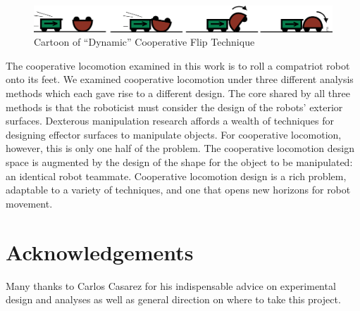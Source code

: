 \documentclass[letterpaper]{report}
\begin{document}
\begin{figure}[ht]
\centering
\includegraphics[width=1.0\textwidth]{Dynamic_CoopCartoon.png}
\caption{Cartoon of ``Dynamic'' Cooperative Flip Technique}
\end{figure}

The cooperative locomotion examined in this work is to roll a compatriot robot onto its feet.
We examined cooperative locomotion under three different analysis methods which each gave rise to a different design.
The core shared by all three methods is that the roboticist must consider the design of the robots' exterior surfaces.
Dexterous manipulation research affords a wealth of techniques for designing effector surfaces to manipulate objects.
For cooperative locomotion, however, this is only one half of the problem.
The cooperative locomotion design space is augmented by the design of the shape for the object to be manipulated: an identical robot teammate.
Cooperative locomotion design is a rich problem, adaptable to a variety of techniques, and one that opens new horizons for robot movement.

\section{Acknowledgements}
Many thanks to Carlos Casarez for his indispensable advice on experimental design and analyses as well as general direction on where to take this project.



\end{document}
